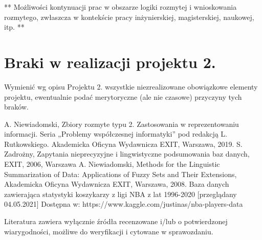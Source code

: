 \documentclass{classrep}
\begin{document}
** Możliwości kontynuacji prac w obszarze logiki rozmytej i wnioskowania rozmytego, zwłaszcza w kontekście pracy inżynierskiej,
magisterskiej, naukowej, itp. **\\



\section{Braki w realizacji projektu 2.}
Wymienić wg opisu Projektu 2. wszystkie niezrealizowane obowiązkowe elementy projektu, ewentualnie
podać merytoryczne (ale nie czasowe) przyczyny tych braków. 


\begin{thebibliography}{99}
  A. Niewiadomski, Zbiory rozmyte typu 2. Zastosowania w reprezentowaniu informacji.  Seria „Problemy współczesnej informatyki” pod redakcją L. Rutkowskiego. Akademicka Oficyna Wydawnicza EXIT, Warszawa, 2019.
 S. Zadrożny, Zapytania nieprecyzyjne i lingwistyczne podsumowania baz danych, EXIT, 2006, Warszawa
 A. Niewiadomski, Methods for the Linguistic Summarization of Data: Applications of Fuzzy Sets and Their Extensions, Akademicka Oficyna Wydawnicza EXIT, Warszawa, 2008.
 Baza danych zawierająca statystyki koszykarzy z ligi NBA z lat 1996-2020 [przeglądany 04.05.2021] Dostępna w:
https://www.kaggle.com/justinas/nba-players-data
\end{thebibliography}

Literatura zawiera wyłącznie źródła recenzowane i/lub o potwierdzonej wiarygodności,
możliwe do weryfikacji i cytowane w sprawozdaniu. 
\end{document}
